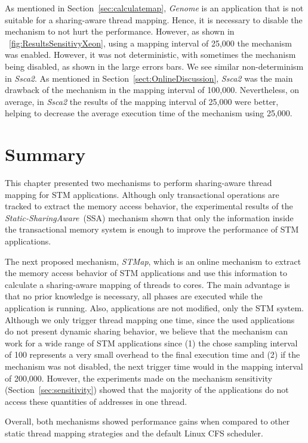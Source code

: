 As mentioned in Section~\ref{sec:calculatemap}, \emph{Genome} is an application that is not suitable for a sharing-aware thread mapping. Hence, it is necessary to disable the mechanism to not hurt the performance. However, as shown in \figurename~\ref{fig:ResultsSensitivyXeon}, using a mapping interval of 25,000 the mechanism was enabled. However, it was not deterministic, with sometimes the mechanism being disabled, as shown in the large errors bars. We see similar non-determinism in \emph{Ssca2}. As mentioned in Section~\ref{sect:OnlineDiscussion}, \emph{Ssca2} was the main drawback of the mechanism in the mapping interval of 100,000. Nevertheless, on average, in \emph{Ssca2} the results of the mapping interval of 25,000 were better, helping to decrease the average execution time of the mechanism using 25,000.

\section{Summary}

This chapter presented two mechanisms to perform sharing-aware thread mapping for STM applications. Although only transactional operations are tracked to extract the memory access behavior, the experimental results of the \emph{Static-SharingAware}~(SSA) mechanism shown that only the information inside the transactional memory system is enough to improve the performance of STM applications.

The next proposed mechanism, \emph{STMap}, which is an online mechanism to extract the memory access behavior of STM applications and use this information to calculate a sharing-aware mapping of threads to cores. The main advantage is that no prior knowledge is necessary, all phases are executed while the application is running. Also, applications are not modified, only the STM system. Although we only trigger thread mapping one time, since the used applications do not present dynamic sharing behavior, we believe that the mechanism can work for a wide range of STM applications since (1) the chose sampling interval of 100 represents a very small overhead to the final execution time and (2) if the mechanism was not disabled, the next trigger time would in the mapping interval of 200,000. However, the experiments made on the mechanism sensitivity (Section~\ref{sec:sensitivity}) showed that the majority of the applications do not access these quantities of addresses in one thread.

Overall, both mechanisms showed performance gains when compared to other static thread mapping strategies and the default Linux CFS scheduler.
